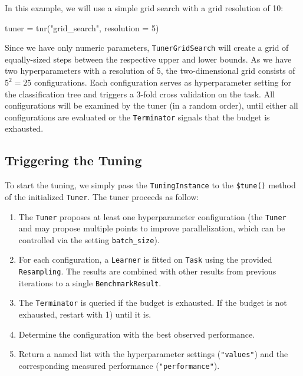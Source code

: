\documentclass[
  11pt,
  parskip=half,
  DIV=calc,
  BCOR=10mm,
  x11names]{scrbook}
\newenvironment{Shaded}{}{}
\newcommand{\DataTypeTok}[1]{#1}
\newcommand{\DecValTok}[1]{#1}
\newcommand{\KeywordTok}[1]{\textcolor[rgb]{0.00,0.00,1.00}{#1}}
\newcommand{\NormalTok}[1]{#1}
\newcommand{\StringTok}[1]{\textcolor[rgb]{0.00,0.50,0.50}{#1}}
\providecommand{\tightlist}{%
  \setlength{\itemsep}{0pt}\setlength{\parskip}{0pt}}
\begin{document}
In this example, we will use a simple grid search with a grid resolution of 10:

\begin{Shaded}
\begin{Highlighting}[]
\NormalTok{tuner =}\StringTok{ }\KeywordTok{tnr}\NormalTok{(}\StringTok{"grid_search"}\NormalTok{, }\DataTypeTok{resolution =} \DecValTok{5}\NormalTok{)}
\end{Highlighting}
\end{Shaded}

Since we have only numeric parameters, \texttt{TunerGridSearch} will create a grid of equally-sized steps between the respective upper and lower bounds.
As we have two hyperparameters with a resolution of 5, the two-dimensional grid consists of \(5^2 = 25\) configurations.
Each configuration serves as hyperparameter setting for the classification tree and triggers a 3-fold cross validation on the task.
All configurations will be examined by the tuner (in a random order), until either all configurations are evaluated or the \texttt{Terminator} signals that the budget is exhausted.

\hypertarget{tuning-triggering}{%
\subsection{Triggering the Tuning}\label{tuning-triggering}}

To start the tuning, we simply pass the \texttt{TuningInstance} to the \texttt{\$tune()} method of the initialized \texttt{Tuner}.
The tuner proceeds as follow:

\begin{enumerate}
\def\labelenumi{\arabic{enumi}.}
\tightlist
\item
  The \texttt{Tuner} proposes at least one hyperparameter configuration (the \texttt{Tuner} and may propose multiple points to improve parallelization, which can be controlled via the setting \texttt{batch\_size}).
\item
  For each configuration, a \texttt{Learner} is fitted on \texttt{Task} using the provided \texttt{Resampling}.
  The results are combined with other results from previous iterations to a single \texttt{BenchmarkResult}.
\item
  The \texttt{Terminator} is queried if the budget is exhausted.
  If the budget is not exhausted, restart with 1) until it is.
\item
  Determine the configuration with the best observed performance.
\item
  Return a named list with the hyperparameter settings (\texttt{"values"}) and the corresponding measured performance (\texttt{"performance"}).
\end{enumerate}
\end{document}
